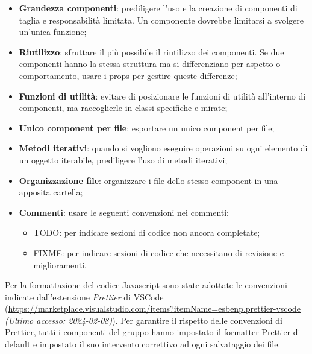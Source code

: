 \documentclass[10pt, a4paper]{article}
\begin{document}
\begin{itemize}
    \item \textbf{Grandezza componenti}: prediligere l'uso e la creazione di componenti di taglia e responsabilità limitata. Un componente dovrebbe limitarsi a svolgere un'unica funzione;
    \item \textbf{Riutilizzo}: sfruttare il più possibile il riutilizzo dei componenti. Se due componenti hanno la stessa struttura ma si differenziano per aspetto o comportamento, usare i props per gestire queste differenze;
    \item \textbf{Funzioni di utilità}: evitare di posizionare le funzioni di utilità all'interno di componenti, ma raccoglierle in classi specifiche e mirate;
    \item \textbf{Unico component per file}: esportare un unico component per file;
    \item \textbf{Metodi iterativi}: quando si vogliono eseguire operazioni su ogni elemento di un oggetto iterabile, prediligere l'uso di metodi iterativi;
    \item \textbf{Organizzazione file}: organizzare i file dello stesso component in una apposita cartella;
    \item \textbf{Commenti}: usare le seguenti convenzioni nei commenti:
        \begin{itemize}
            \item TODO: per indicare sezioni di codice non ancora completate;
            \item FIXME: per indicare sezioni di codice che necessitano di revisione e miglioramenti.
        \end{itemize}
\end{itemize}
 Per la formattazione del codice Javascript sono state adottate le convenzioni indicate dall'estensione \textit{Prettier\pg} di VSCode (\url{https://marketplace.visualstudio.com/items?itemName=esbenp.prettier-vscode} \textit{(Ultimo accesso: 2024-02-08)}).
Per garantire il rispetto delle convenzioni di Prettier, tutti i componenti del gruppo hanno impostato il formatter Prettier di default e impostato il suo intervento correttivo ad ogni salvataggio dei file.
\end{document}

